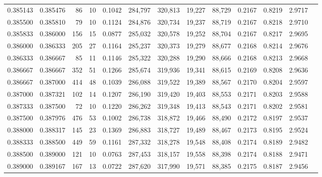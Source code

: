 \begin{tabular}{rrrrrrrrrrrrr}
0.385143 & 0.385476 &    86 &  10 &                                     0.1042 & 284,797 & 320,813 &  19,227 &  88,729 & 0.2167 & 0.8219 & 2.9717 \\
0.385500 & 0.385810 &    79 &  10 &                                     0.1124 & 284,876 & 320,734 &  19,237 &  88,719 & 0.2167 & 0.8218 & 2.9710 \\
0.385833 & 0.386000 &   156 &  15 &                                     0.0877 & 285,032 & 320,578 &  19,252 &  88,704 & 0.2167 & 0.8217 & 2.9695 \\
0.386000 & 0.386333 &   205 &  27 &                                     0.1164 & 285,237 & 320,373 &  19,279 &  88,677 & 0.2168 & 0.8214 & 2.9676 \\
0.386333 & 0.386667 &    85 &  11 &                                     0.1146 & 285,322 & 320,288 &  19,290 &  88,666 & 0.2168 & 0.8213 & 2.9668 \\
0.386667 & 0.386667 &   352 &  51 &                                     0.1266 & 285,674 & 319,936 &  19,341 &  88,615 & 0.2169 & 0.8208 & 2.9636 \\
0.386667 & 0.387000 &   414 &  48 &                                     0.1039 & 286,088 & 319,522 &  19,389 &  88,567 & 0.2170 & 0.8204 & 2.9597 \\
0.387000 & 0.387321 &   102 &  14 &                                     0.1207 & 286,190 & 319,420 &  19,403 &  88,553 & 0.2171 & 0.8203 & 2.9588 \\
0.387333 & 0.387500 &    72 &  10 &                                     0.1220 & 286,262 & 319,348 &  19,413 &  88,543 & 0.2171 & 0.8202 & 2.9581 \\
0.387500 & 0.387976 &   476 &  53 &                                     0.1002 & 286,738 & 318,872 &  19,466 &  88,490 & 0.2172 & 0.8197 & 2.9537 \\
0.388000 & 0.388317 &   145 &  23 &                                     0.1369 & 286,883 & 318,727 &  19,489 &  88,467 & 0.2173 & 0.8195 & 2.9524 \\
0.388333 & 0.388500 &   449 &  59 &                                     0.1161 & 287,332 & 318,278 &  19,548 &  88,408 & 0.2174 & 0.8189 & 2.9482 \\
0.388500 & 0.389000 &   121 &  10 &                                     0.0763 & 287,453 & 318,157 &  19,558 &  88,398 & 0.2174 & 0.8188 & 2.9471 \\
0.389000 & 0.389167 &   167 &  13 &                                     0.0722 & 287,620 & 317,990 &  19,571 &  88,385 & 0.2175 & 0.8187 & 2.9456 \\

\end{tabular}
